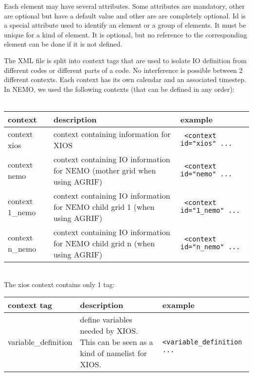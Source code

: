 \documentclass[NEMO_book]{subfiles}
\begin{document}
Each element may have several attributes. Some attributes are mandatory, other are optional but have a default value and other are are completely optional. Id is a special attribute used to identify an element or a group of elements. It must be unique for a kind of element. It is optional, but no reference to the corresponding element can be done if it is not defined.

The XML file is split into context tags that are used to isolate IO definition from different codes or different parts of a code. No interference is possible between 2 different contexts. Each context has its own calendar and an associated timestep. In NEMO, we used the following contexts (that can be defined in any order):\\
\\
\begin{tabular}{|p{3.0cm}|p{4.5cm}|p{4.5cm}|}
   \hline
   context &
   description &
   example \\
   \hline
   \hline
   context xios &
   context containing information for XIOS &
   {\scriptsize \verb? <context id="xios" ...  ?} \\
   \hline
   context nemo &
   context containing IO information for NEMO (mother grid when using AGRIF) &
   {\scriptsize \verb? <context id="nemo" ... ?} \\
   \hline
   context 1\_nemo &
   context containing IO information for NEMO child grid 1 (when using AGRIF) &
   {\scriptsize \verb? <context id="1_nemo" ...  ?} \\
   \hline
   context n\_nemo &
   context containing IO information for NEMO child grid n (when using AGRIF) &
   {\scriptsize \verb? <context id="n_nemo" ...  ?} \\
   \hline
\end{tabular}
\\

\noindent The xios context contains only 1 tag:
\\
\begin{tabular}{|p{3.0cm}|p{4.5cm}|p{4.5cm}|}
   \hline
   context tag &
   description &
   example \\
   \hline
   \hline
   variable\_definition &
   define variables needed by XIOS. This can be seen as a kind of namelist for XIOS. &
   {\scriptsize \verb? <variable_definition ... ?} \\
   \hline
\end{tabular}
\\
\end{document}
